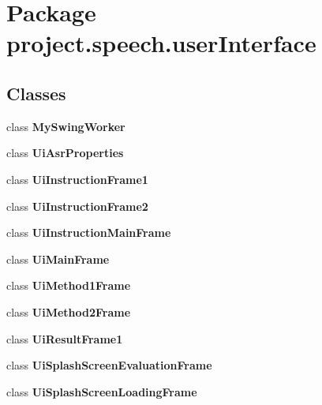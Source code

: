 \section{Package project.\+speech.\+user\+Interface}
\label{namespaceproject_1_1speech_1_1user_interface}
\subsection*{Classes}
\begin{DoxyCompactItemize}
\item 
class {\bfseries My\+Swing\+Worker}
\item 
class {\bf Ui\+Asr\+Properties}
\item 
class {\bf Ui\+Instruction\+Frame1}
\item 
class {\bf Ui\+Instruction\+Frame2}
\item 
class {\bf Ui\+Instruction\+Main\+Frame}
\item 
class {\bf Ui\+Main\+Frame}
\item 
class {\bf Ui\+Method1\+Frame}
\item 
class {\bf Ui\+Method2\+Frame}
\item 
class {\bf Ui\+Result\+Frame1}
\item 
class {\bf Ui\+Splash\+Screen\+Evaluation\+Frame}
\item 
class {\bf Ui\+Splash\+Screen\+Loading\+Frame}
\end{DoxyCompactItemize}

